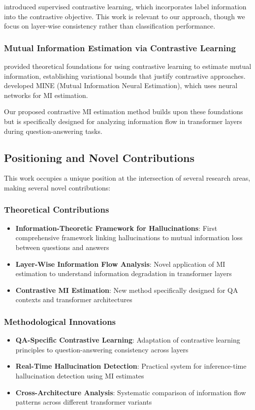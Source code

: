 \citet{khosla2020supervised} introduced supervised contrastive learning, which incorporates label information into the contrastive objective. This work is relevant to our approach, though we focus on layer-wise consistency rather than classification performance.

\subsubsection{Mutual Information Estimation via Contrastive Learning}
\citet{poole2019variational} provided theoretical foundations for using contrastive learning to estimate mutual information, establishing variational bounds that justify contrastive approaches. \citet{belghazi2018mutual} developed MINE (Mutual Information Neural Estimation), which uses neural networks for MI estimation.

Our proposed contrastive MI estimation method builds upon these foundations but is specifically designed for analyzing information flow in transformer layers during question-answering tasks.

\subsection{Positioning and Novel Contributions}
\label{subsec:positioning}

This work occupies a unique position at the intersection of several research areas, making several novel contributions:

\subsubsection{Theoretical Contributions}
\begin{itemize}
    \item \textbf{Information-Theoretic Framework for Hallucinations}: First comprehensive framework linking hallucinations to mutual information loss between questions and answers
    \item \textbf{Layer-Wise Information Flow Analysis}: Novel application of MI estimation to understand information degradation in transformer layers
    \item \textbf{Contrastive MI Estimation}: New method specifically designed for QA contexts and transformer architectures
\end{itemize}

\subsubsection{Methodological Innovations}
\begin{itemize}
    \item \textbf{QA-Specific Contrastive Learning}: Adaptation of contrastive learning principles to question-answering consistency across layers
    \item \textbf{Real-Time Hallucination Detection}: Practical system for inference-time hallucination detection using MI estimates
    \item \textbf{Cross-Architecture Analysis}: Systematic comparison of information flow patterns across different transformer variants
\end{itemize}

